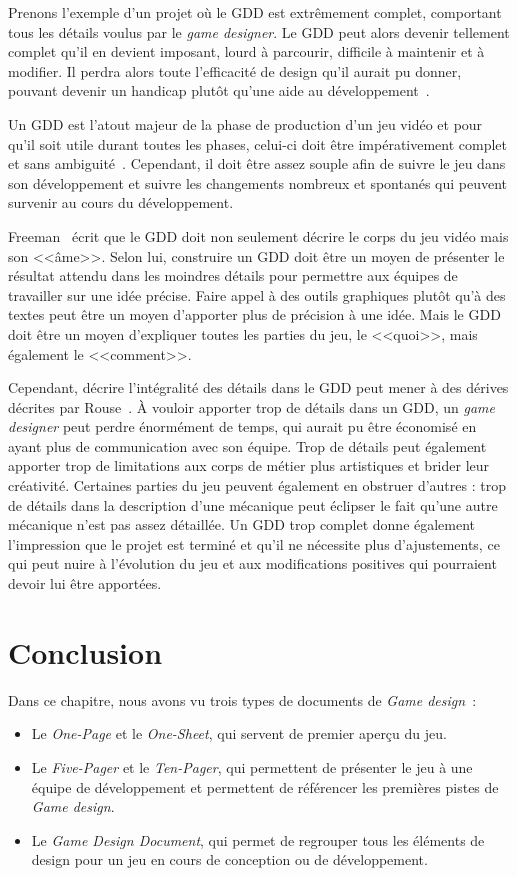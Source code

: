Prenons l'exemple d'un projet où le GDD est extrêmement complet, comportant tous les détails voulus par le \emph{game designer}.
Le GDD peut alors devenir tellement complet qu'il en devient imposant, lourd à parcourir, difficile à maintenir et à modifier.
Il perdra alors toute l'efficacité de design qu'il aurait pu donner, pouvant devenir un handicap plutôt qu'une aide au développement~\cite{onepage_librande}.

Un GDD est l'atout majeur de la phase de production d'un jeu vidéo et pour qu'il soit utile durant toutes les phases, celui-ci doit être impérativement complet et sans ambiguité~\cite{GD_Guidelines}.
Cependant, il doit être assez souple afin de suivre le jeu dans son développement et suivre les changements nombreux et spontan\'es qui peuvent survenir au cours du développement.

Freeman~\cite{gama_greateGDD} écrit que le GDD doit non seulement décrire le corps du jeu vidéo mais son <<âme>>.
Selon lui, construire un GDD doit être un moyen de présenter le résultat attendu dans les moindres détails pour permettre aux équipes de travailler sur une idée précise.
Faire appel à des outils graphiques plutôt qu'à des textes peut être un moyen d'apporter plus de précision à une idée.
Mais le GDD doit être un moyen d'expliquer toutes les parties du jeu, le <<quoi>>, mais également le <<comment>>.

Cependant, décrire l'intégralité des détails dans le GDD peut mener à des dérives décrites par Rouse~\cite{GD_theory_rouse}.
À vouloir apporter trop de détails dans un GDD, un \emph{game designer} peut perdre énormément de temps, qui aurait pu être économisé en ayant plus de communication avec son équipe.
Trop de détails peut également apporter trop de limitations aux corps de métier plus artistiques et brider leur créativité.
Certaines parties du jeu peuvent également en obstruer d'autres : trop de détails dans la description d'une mécanique peut éclipser le fait qu'une autre mécanique n'est pas assez détaillée.
Un GDD trop complet donne également l'impression que le projet est terminé et qu'il ne nécessite plus d'ajustements, ce qui peut nuire à l'évolution du jeu et aux modifications positives qui pourraient devoir lui être apport\'ees.


\section{Conclusion}
Dans ce chapitre, nous avons vu trois types de documents de \emph{Game design}~: 
\begin{itemize}
    \item Le \emph{One-Page} et le \emph{One-Sheet}, qui servent de premier aperçu du jeu.
    \item Le \emph{Five-Pager} et le \emph{Ten-Pager}, qui permettent de présenter le jeu à une équipe de développement et permettent de référencer les premières pistes de \emph{Game design}.
    \item Le \emph{Game Design Document}, qui permet de regrouper tous les éléments de design pour un jeu en cours de conception ou de développement.
\end{itemize}



